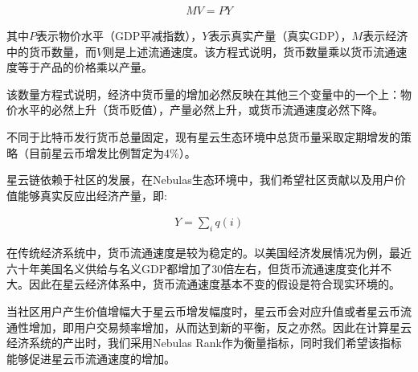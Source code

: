 \begin{align}
MV=PY
\end{align}

其中$P$表示物价水平（GDP平减指数），$Y$表示真实产量（真实GDP），$M$表示经济中的货币数量，而$V$则是上述流通速度。该方程式说明，货币数量乘以货币流通速度等于产品的价格乘以产量。

该数量方程式说明，经济中货币量的增加必然反映在其他三个变量中的一个上：物价水平的必然上升（货币贬值），产量必然上升，或货币流通速度必然下降。

不同于比特币发行货币总量固定，现有星云生态环境中总货币量采取定期增发的策略（目前星云币增发比例暂定为4\%）。


星云链依赖于社区的发展，在Nebulas生态环境中，我们希望社区贡献以及用户价值能够真实反应出经济产量，即:

\begin{align}
Y=\sum_i q(i)
\end{align}

在传统经济系统中，货币流通速度是较为稳定的。以美国经济发展情况为例，最近六十年美国名义供给与名义GDP都增加了30倍左右，但货币流通速度变化并不大。因此在星云经济体系中，货币流通速度基本不变的假设是符合现实环境的。

当社区用户产生价值增幅大于星云币增发幅度时，星云币会对应升值或者星云币流通性增加，即用户交易频率增加，从而达到新的平衡，反之亦然。因此在计算星云经济系统的产出时，我们采用Nebulas Rank作为衡量指标，同时我们希望该指标能够促进星云币流通速度的增加。



